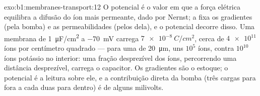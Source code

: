 \begin{solution}{exo:b1:membranes-transport:12}
O potencial é o valor em que a força elétrica equilibra a difusão do íon
mais permeante, dado por Nernst; a  fixa os gradientes (pela
bomba) e as permeabilidades (pelos  dela), e o potencial decorre
disso. Uma membrana de \qty{1}{\micro F/cm^2} a \qty{-70}{mV} carrega
$\qty{7e-8}{C/cm^2}$, cerca de $\num{4e11}$ íons por centímetro quadrado
--- para uma  de \qty{20}{\micro m}, uns $10^5$ íons, contra
$10^{10}$ íons potássio no interior: uma fração desprezível dos íons,
percorrendo uma distância desprezível, carrega o capacitor. Os
gradientes são o estoque; o potencial é a leitura sobre ele, e a
contribuição direta da bomba (três cargas para fora a cada duas para
dentro) é de alguns milivolts.
\end{solution}


